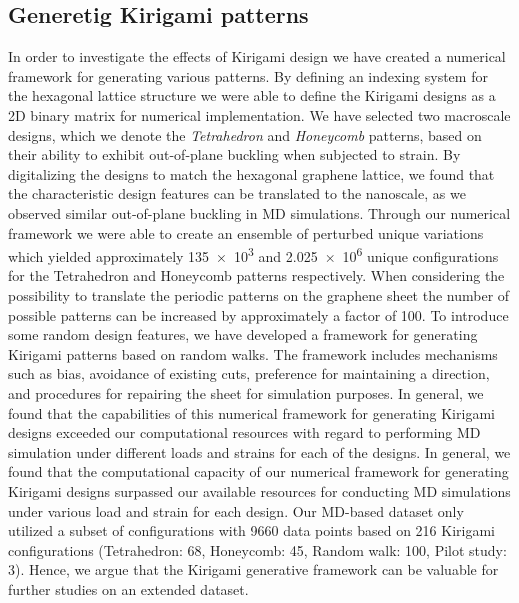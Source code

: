 \subsection{Generetig Kirigami patterns}
In order to investigate the effects of Kirigami design we have created a
numerical framework for generating various patterns. By defining an indexing
system for the hexagonal lattice structure we were able to define the Kirigami
designs as a 2D binary matrix for numerical implementation. We have selected two
macroscale designs, which we denote the \textit{Tetrahedron} and
\textit{Honeycomb} patterns, based on their ability to exhibit
out-of-plane buckling when subjected to strain. By digitalizing the designs to
match the hexagonal graphene lattice, we found that the characteristic design
features can be translated to the nanoscale, as we observed similar out-of-plane
buckling in \acrshort{MD} simulations. Through our numerical framework we were
able to create an ensemble of perturbed unique variations which yielded
approximately \num{135e3} and \num{2.025e6} unique configurations for the
Tetrahedron and Honeycomb patterns respectively. When considering the
possibility to translate the periodic patterns on the graphene sheet the number of possible patterns can be increased by approximately a factor of 100. To introduce some random design features, we have developed a framework for generating Kirigami patterns based on random walks. The framework includes mechanisms such as bias, avoidance of existing cuts, preference for maintaining a direction, and procedures for repairing the sheet for simulation purposes. In general, we found that the
capabilities of this numerical framework for generating Kirigami designs exceeded
our computational resources with regard to performing \acrshort{MD} simulation
under different loads and strains for each of the designs. In general, we found that the computational capacity of our numerical framework for generating Kirigami designs surpassed our available resources for conducting  \acrshort{MD} simulations under various load and strain for each design. Our \acrshort{MD}-based dataset only utilized a subset of configurations with 9660 data points based on 216 Kirigami configurations (Tetrahedron: 68, Honeycomb:
45, Random walk: 100, Pilot study: 3). Hence, we argue that the Kirigami generative framework can be valuable for further studies on an extended dataset.


